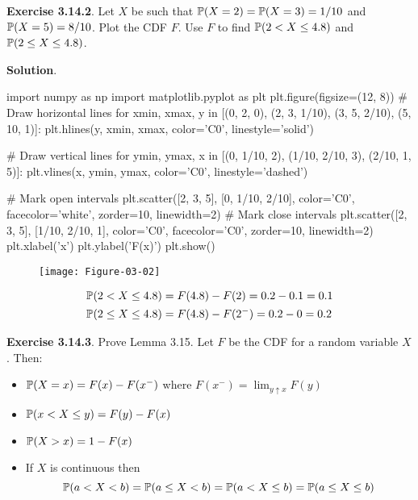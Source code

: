 \textbf{Exercise 3.14.2}. Let \(X\) be such that
\(\operatorname{\mathbb{P}}(X = 2) = \operatorname{\mathbb{P}}(X = 3) = 1/10\) and
\(\operatorname{\mathbb{P}}(X = 5) = 8/10\). Plot the CDF \(F\). Use \(F\) to find
\(\operatorname{\mathbb{P}}(2 < X \leq 4.8)\) and \(\operatorname{\mathbb{P}}(2 \leq X \leq 4.8)\).

\textbf{Solution}.

\begin{python}
import numpy as np
import matplotlib.pyplot as plt
plt.figure(figsize=(12, 8))
# Draw horizontal lines
for xmin, xmax, y in [(0, 2, 0), (2, 3, 1/10), (3, 5, 2/10), (5, 10, 1)]:
    plt.hlines(y, xmin, xmax, color='C0', linestyle='solid')
    
# Draw vertical lines
for ymin, ymax, x in [(0, 1/10, 2), (1/10, 2/10, 3), (2/10, 1, 5)]:
    plt.vlines(x, ymin, ymax, color='C0', linestyle='dashed')
    
# Mark open intervals
plt.scatter([2, 3, 5], [0, 1/10, 2/10], color='C0', facecolor='white', zorder=10, linewidth=2)
# Mark close intervals
plt.scatter([2, 3, 5], [1/10, 2/10, 1], color='C0', facecolor='C0', zorder=10, linewidth=2)
plt.xlabel('x')
plt.ylabel('F(x)')
plt.show()
\end{python}

\begin{figure}[H]
\centering
\texttt{[image: Figure-03-02]}
\end{figure}

\begin{align*}
\operatorname{\mathbb{P}}(2 < X \leq 4.8) 
& = F(4.8) - F(2) = 0.2 - 0.1 = 0.1
\\
\operatorname{\mathbb{P}}(2 \leq X \leq 4.8) 
& = F(4.8) - F(2^{-}) = 0.2 - 0 = 0.2
\end{align*}

\textbf{Exercise 3.14.3}. Prove Lemma 3.15.
Let \(F\) be the CDF for a random variable \(X\). Then:
\begin{itemize}
\item
  \(\operatorname{\mathbb{P}}(X = x) = F(x) - F(x^-)\) where
  \(F(x^-) = \lim_{y \uparrow x} F(y)\)
\item
  \(\operatorname{\mathbb{P}}(x < X \leq y) = F(y) - F(x)\)
\item
  \(\operatorname{\mathbb{P}}(X > x) = 1 - F(x)\)
\item
  If \(X\) is continuous then
  \[
\operatorname{\mathbb{P}}(a < X < b) = \operatorname{\mathbb{P}}(a \leq X < b) = \operatorname{\mathbb{P}}(a < X \leq b) = \operatorname{\mathbb{P}}(a \leq X \leq b)
\]
\end{itemize}

